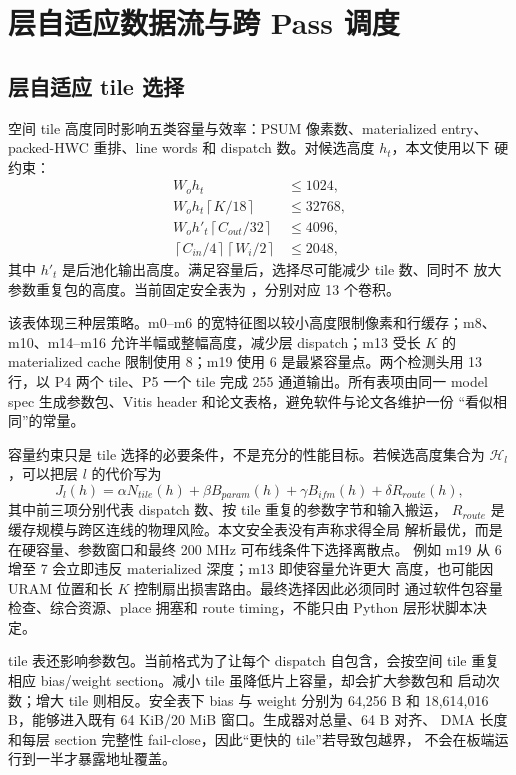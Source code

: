 \section{层自适应数据流与跨 Pass 调度}
\label{sec:scheduling}

\subsection{层自适应 tile 选择}

空间 tile 高度同时影响五类容量与效率：PSUM 像素数、materialized entry、
packed-HWC 重排、line words 和 dispatch 数。对候选高度 $h_t$，本文使用以下
硬约束：
\begin{align}
W_o h_t &\le 1024,\\
W_o h_t\left\lceil K/18\right\rceil&\le32768,\\
W_o h'_t\left\lceil C_{out}/32\right\rceil&\le4096,\\
\left\lceil C_{in}/4\right\rceil\left\lceil W_i/2\right\rceil&\le2048,
\end{align}
其中 $h'_t$ 是后池化输出高度。满足容量后，选择尽可能减少 tile 数、同时不
放大参数重复包的高度。当前固定安全表为
，分别对应 13 个卷积。

该表体现三种层策略。m0--m6 的宽特征图以较小高度限制像素和行缓存；m8、
m10、m14--m16 允许半幅或整幅高度，减少层 dispatch；m13 受长 $K$ 的
materialized cache 限制使用 8；m19 使用 6 是最紧容量点。两个检测头用
13 行，以 P4 两个 tile、P5 一个 tile 完成 255 通道输出。所有表项由同一
model spec 生成参数包、Vitis header 和论文表格，避免软件与论文各维护一份
“看似相同”的常量。

容量约束只是 tile 选择的必要条件，不是充分的性能目标。若候选高度集合为
$\mathcal{H}_l$，可以把层 $l$ 的代价写为
\begin{equation}
J_l(h)=\alpha N_{tile}(h)+\beta B_{param}(h)+\gamma B_{ifm}(h)
+\delta R_{route}(h),
\end{equation}
其中前三项分别代表 dispatch 数、按 tile 重复的参数字节和输入搬运，
$R_{route}$ 是缓存规模与跨区连线的物理风险。本文安全表没有声称求得全局
解析最优，而是在硬容量、参数窗口和最终 200 MHz 可布线条件下选择离散点。
例如 m19 从 6 增至 7 会立即违反 materialized 深度；m13 即使容量允许更大
高度，也可能因 URAM 位置和长 $K$ 控制扇出损害路由。最终选择因此必须同时
通过软件包容量检查、综合资源、place 拥塞和 route timing，不能只由 Python
层形状脚本决定。

tile 表还影响参数包。当前格式为了让每个 dispatch 自包含，会按空间 tile
重复相应 bias/weight section。减小 tile 虽降低片上容量，却会扩大参数包和
启动次数；增大 tile 则相反。安全表下 bias 与 weight 分别为 64,256 B 和
18,614,016 B，能够进入既有 64 KiB/20 MiB 窗口。生成器对总量、64 B 对齐、
DMA 长度和每层 section 完整性 fail-close，因此“更快的 tile”若导致包越界，
不会在板端运行到一半才暴露地址覆盖。

